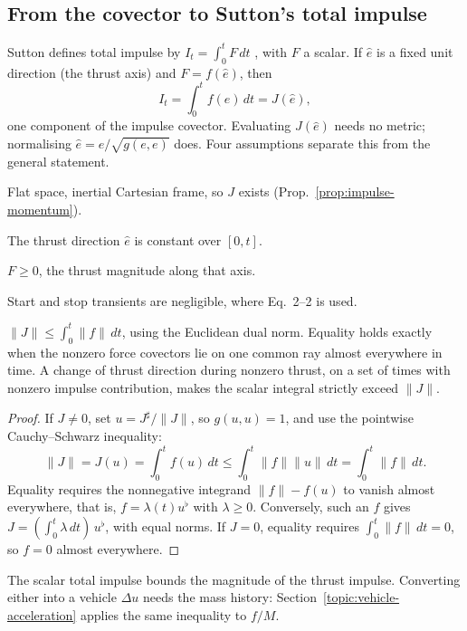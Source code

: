 \subsection{From the covector to Sutton's total impulse}
Sutton defines total impulse by $I_t=\int_0^t F\,dt$
\cite[Eq.~2--1]{sutton}, with $F$ a scalar. If $\hat e$ is a fixed unit
direction (the thrust axis) and $F=f(\hat e)$, then
\[
 I_t=\int_0^{t}f(\hat e)\,dt=J(\hat e),
\]
one component of the impulse covector. Evaluating $J(\hat e)$ needs no
metric; normalising $\hat e=e/\sqrt{g(e,e)}$ does. Four assumptions separate
this from the general statement.
\begin{description}\itemsep2pt
\item[A1] Flat space, inertial Cartesian frame, so $J$ exists
  (Prop.~\ref{prop:impulse-momentum}).
\item[A2] The thrust direction $\hat e$ is constant over $[0,t]$.
\item[A3] $F\ge0$, the thrust magnitude along that axis.
\item[A4] Start and stop transients are negligible, where Eq.~2--2 is used.
\end{description}

\begin{proposition}\label{prop:scalar-bound}
$\lVert J\rVert\le\int_0^t\lVert f\rVert\,dt$, using the Euclidean dual norm.
Equality holds exactly when the nonzero force covectors lie on one common
ray almost everywhere in time. A change of thrust direction during nonzero
thrust, on a set of times with nonzero impulse contribution, makes the
scalar integral strictly exceed $\lVert J\rVert$.
\end{proposition}

\begin{proof}
If $J\ne0$, set $u=J^\sharp/\lVert J\rVert$, so $g(u,u)=1$, and use the
pointwise Cauchy--Schwarz inequality:
\[
 \lVert J\rVert=J(u)
 =\int_0^t f(u)\,dt
 \le\int_0^t\lVert f\rVert\lVert u\rVert\,dt
 =\int_0^t\lVert f\rVert\,dt.
\]
Equality requires the nonnegative integrand $\lVert f\rVert-f(u)$ to
vanish almost everywhere, that is, $f=\lambda(t)u^\flat$ with
$\lambda\ge0$. Conversely, such an $f$ gives
$J=(\int_0^t\lambda\,dt)\,u^\flat$, with equal norms. If $J=0$, equality
requires $\int_0^t\lVert f\rVert\,dt=0$, so $f=0$ almost everywhere.
\end{proof}

\noindent The scalar total impulse bounds the magnitude of the thrust
impulse. Converting either into a vehicle $\Delta u$ needs the mass history:
Section~\ref{topic:vehicle-acceleration} applies the same inequality to
$f/M$.

